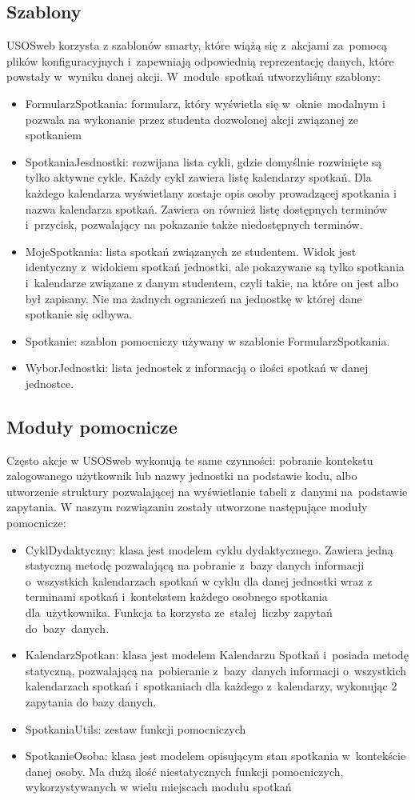 \documentclass[licencjacka]{pracamgr}
\begin{document}
\subsection{Szablony}
USOSweb korzysta z szablonów smarty, które wiążą się z~akcjami za~pomocą plików konfiguracyjnych i~zapewniają odpowiednią reprezentację danych, które powstały w~wyniku danej akcji. W~module~spotkań utworzyliśmy szablony:
\begin{itemize}
\item{FormularzSpotkania: formularz, który wyświetla się w~oknie~modalnym i pozwala na wykonanie przez studenta dozwolonej akcji związanej ze spotkaniem}
\item{SpotkaniaJesdnostki: rozwijana lista cykli, gdzie domyślnie rozwinięte są tylko aktywne cykle. Każdy cykl zawiera listę kalendarzy spotkań. Dla każdego kalendarza wyświetlany zostaje opis osoby prowadzącej spotkania i nazwa kalendarza spotkań. Zawiera on również listę dostępnych terminów i~przycisk, pozwalający na pokazanie także niedostępnych terminów.}
\item{MojeSpotkania: lista spotkań związanych ze studentem. Widok jest identyczny z~widokiem spotkań jednostki, ale pokazywane są tylko spotkania i~kalendarze związane z danym studentem, czyli takie, na które on jest albo był zapisany. Nie ma żadnych ograniczeń na jednostkę w której dane spotkanie się odbywa.}
\item{Spotkanie: szablon pomocniczy używany w szablonie FormularzSpotkania.}
\item{WyborJednostki: lista jednostek z informacją o ilości spotkań w danej jednostce.}
\end{itemize}
\subsection{Moduły pomocnicze}
Często akcje w USOSweb wykonują te same czynności: pobranie kontekstu zalogowanego użytkownik lub nazwy jednostki na podstawie kodu, albo utworzenie struktury pozwalającej na wyświetlanie tabeli z~danymi na~podstawie zapytania.
W naszym rozwiązaniu zostały utworzone następujące moduły pomocnicze:
\begin{itemize}
\item{CyklDydaktyczny: klasa jest modelem cyklu dydaktycznego. Zawiera jedną statyczną metodę pozwalającą na pobranie z~bazy danych informacji o~wszystkich kalendarzach spotkań w cyklu dla danej jednostki wraz z terminami spotkań i~kontekstem każdego osobnego spotkania dla~użytkownika. Funkcja ta korzysta ze~stałej~liczby zapytań do~bazy~danych.}
\item{KalendarzSpotkan: klasa jest modelem Kalendarzu Spotkań i~posiada metodę statyczną, pozwalającą na~pobieranie z~bazy~danych informacji o~wszystkich kalendarzach spotkań i~spotkaniach dla każdego z~kalendarzy, wykonując 2 zapytania do bazy danych.}
\item{SpotkaniaUtils: zestaw funkcji pomocniczych}
\item{SpotkanieOsoba: klasa jest modelem opisującym stan spotkania w~kontekście danej osoby. Ma dużą ilość niestatycznych funkcji pomocniczych, wykorzystywanych w wielu miejscach modułu spotkań}
\end{itemize}
\end{document}
